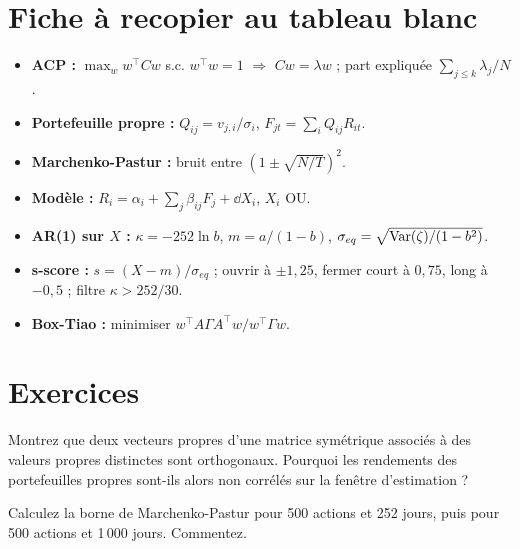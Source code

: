 \section{Fiche à recopier au tableau blanc}

\begin{whiteboard}
\begin{itemize}[leftmargin=1.2em]
\item \textbf{ACP :} $\max_w w^\top Cw$ s.c. $w^\top w=1$ $\Rightarrow$ $Cw = \lambda w$ ; part expliquée $\sum_{j\le k}\lambda_j/N$.
\item \textbf{Portefeuille propre :} $Q_{ij} = v_{j,i}/\sigma_i$, $F_{jt} = \sum_iQ_{ij}R_{it}$.
\item \textbf{Marchenko-Pastur :} bruit entre $(1\pm\sqrt{N/T})^2$.
\item \textbf{Modèle :} $R_i = \alpha_i + \sum_j\beta_{ij}F_j + \dd X_i$, $X_i$ OU.
\item \textbf{AR(1) sur $X$ :} $\kappa = -252\ln b$, $m = a/(1-b)$, $\sigma_{eq} = \sqrt{\operatorname{Var}(\zeta)/(1-b^2)}$.
\item \textbf{s-score :} $s = (X - m)/\sigma_{eq}$ ; ouvrir à $\pm1{,}25$, fermer court à $0{,}75$, long à $-0{,}5$ ; filtre $\kappa > 252/30$.
\item \textbf{Box-Tiao :} minimiser $w^\top A\Gamma A^\top w/w^\top\Gamma w$.
\end{itemize}
\end{whiteboard}

\section{Exercices}

\begin{exercise}
Montrez que deux vecteurs propres d'une matrice symétrique associés à des valeurs propres distinctes sont orthogonaux. Pourquoi les rendements des portefeuilles propres sont-ils alors non corrélés sur la fenêtre d'estimation ?
\end{exercise}

\begin{exercise}
Calculez la borne de Marchenko-Pastur pour 500 actions et 252 jours, puis pour 500 actions et 1\,000 jours. Commentez.
\end{exercise}

